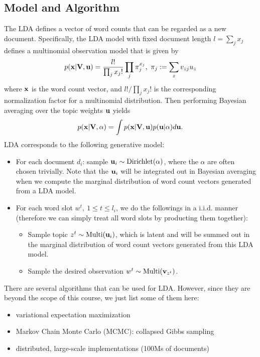 \documentclass[../main.tex]{subfiles}
\begin{document}
\subsection{Model and Algorithm}
The LDA defines a vector of word counts that can be regarded as a new document. Specifically, the LDA model with fixed document length $l=\sum_j x_j$ defines a multinomial observation model that is given by
\begin{equation*}
p({\bf x}|{\bf V, u})=\frac{l!}{\prod_j x_j!}\prod_j \pi_j^{x_j},\ \pi_j := \sum_z v_{zj}u_z
\end{equation*}
where ${\bf x}$ is the word count vector, and $l!/\prod_j x_j!$ is the corresponding normalization factor for a multinomial distribution. Then performing Bayesian averaging over the topic weights ${\bf u}$ yields
\begin{equation*}
p({\bf x}|{\bf V}, \alpha) = \int p({\bf x}|{\bf V, u}) p({\bf u}|\alpha)d{\bf u}.
\end{equation*}
LDA corresponds to the following generative model:
\begin{itemize}
	\item For each document $d_i$: sample ${\bf u}_i\sim \text{Dirichlet}(\alpha)$, where the $\alpha$ are often chosen trivially. Note that the ${\bf u}_i$ will be integrated out in Bayesian averaging when we compute the marginal distribution of word count vectors generated from a LDA model.
	\item For each word slot $w^t,\ 1\leq t\leq l_i$, we do the followings in a i.i.d. manner (therefore we can simply treat all word slots by producting them together):
	\begin{itemize}
		\item Sample topic $z^t \sim \text{Multi}({\bf u}_i)$, which is latent and will be summed out in the marginal distribution of word count vectors generated from this LDA model.
		\item Sample the desired observation $w^t\sim \text{Multi}({\bf v}_{z^t})$.
	\end{itemize}
\end{itemize}
\par There are several algorithms that can be used for LDA. However, since they are beyond the scope of this course, we just list some of them here:
\begin{itemize}
	\item variational expectation maximization
	\item Markov Chain Monte Carlo (MCMC): collapsed Gibbs sampling
	\item distributed, large-scale implementations (100Ms of documents)
\end{itemize}
\end{document}
